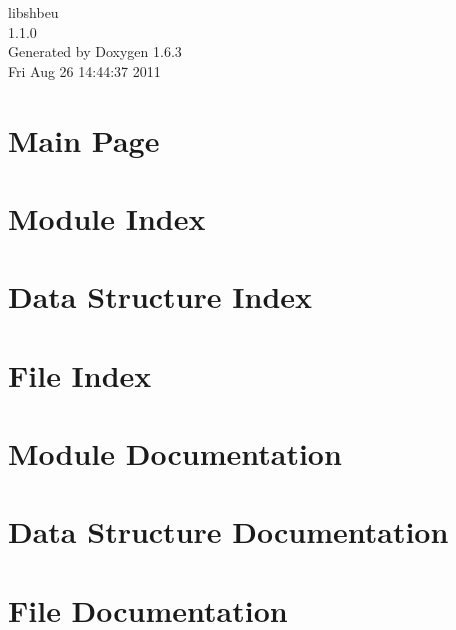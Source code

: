 \documentclass[a4paper]{book}
\begin{document}
\begin{titlepage}
\vspace*{7cm}
\begin{center}
{\Large libshbeu \\[1ex]\large 1.1.0 }\\
\vspace*{1cm}
{\large Generated by Doxygen 1.6.3}\\
\vspace*{0.5cm}
{\small Fri Aug 26 14:44:37 2011}\\
\end{center}
\end{titlepage}
\clearemptydoublepage
{}
\tableofcontents
\clearemptydoublepage
{}
\chapter{Main Page}
\label{index}
\chapter{Module Index}

\chapter{Data Structure Index}

\chapter{File Index}

\chapter{Module Documentation}



\chapter{Data Structure Documentation}




\chapter{File Documentation}

\printindex
\end{document}
